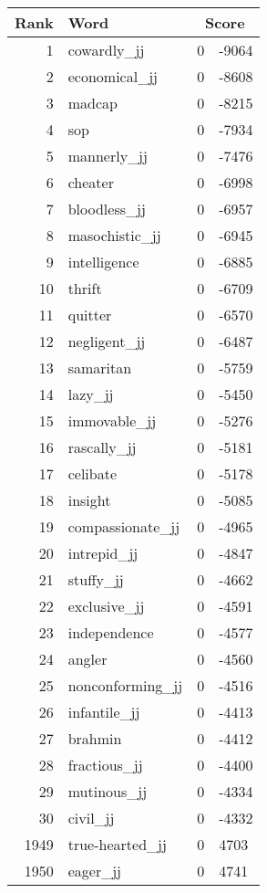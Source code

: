 \begin{longtable}[!htbp]{| rlr@{.}l |}
    \hline
    \textbf{Rank} & \textbf{Word} & \multicolumn{2}{c|}{\textbf{Score}} \\
    \hline
    \endhead
    1 & cowardly\_jj & 0 & -9064 \\
    2 & economical\_jj & 0 & -8608 \\
    3 & madcap & 0 & -8215 \\
    4 & sop & 0 & -7934 \\
    5 & mannerly\_jj & 0 & -7476 \\
    6 & cheater & 0 & -6998 \\
    7 & bloodless\_jj & 0 & -6957 \\
    8 & masochistic\_jj & 0 & -6945 \\
    9 & intelligence & 0 & -6885 \\
    10 & thrift & 0 & -6709 \\
    11 & quitter & 0 & -6570 \\
    12 & negligent\_jj & 0 & -6487 \\
    13 & samaritan & 0 & -5759 \\
    14 & lazy\_jj & 0 & -5450 \\
    15 & immovable\_jj & 0 & -5276 \\
    16 & rascally\_jj & 0 & -5181 \\
    17 & celibate & 0 & -5178 \\
    18 & insight & 0 & -5085 \\
    19 & compassionate\_jj & 0 & -4965 \\
    20 & intrepid\_jj & 0 & -4847 \\
    21 & stuffy\_jj & 0 & -4662 \\
    22 & exclusive\_jj & 0 & -4591 \\
    23 & independence & 0 & -4577 \\
    24 & angler & 0 & -4560 \\
    25 & nonconforming\_jj & 0 & -4516 \\
    26 & infantile\_jj & 0 & -4413 \\
    27 & brahmin & 0 & -4412 \\
    28 & fractious\_jj & 0 & -4400 \\
    29 & mutinous\_jj & 0 & -4334 \\
    30 & civil\_jj & 0 & -4332 \\
    1949 & true-hearted\_jj & 0 & 4703 \\
    1950 & eager\_jj & 0 & 4741 \\

\end{longtable}
